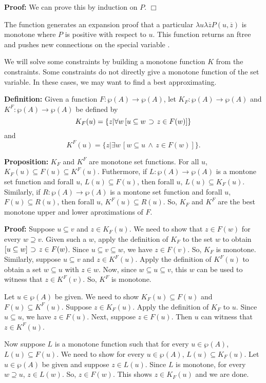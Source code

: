 {\bf Proof:}  We can prove this by induction on $P$.
$\Box$

The function  generates an expansion
proof that a particular $\lambda u\lambda \overline{z} P(u,\overline{z})$
is monotone where $P$ is positive with respect to $u$.
This function returns an ftree and pushes new connections
on the special variable .

We will solve some constraints by building a monotone function $K$
from the constraints.  Some constraints do not directly give a monotone
function of the set variable.  In these cases, we may want to find
a best approximating.

{\bf Definition:}  Given a function $F:\wp(A)\rightarrow\wp(A)$, let
$K_F:\wp(A)\rightarrow\wp(A)$ and $K^F:\wp(A)\rightarrow\wp(A)$ be
defined by 
$$K_F(u) = \{z | \forall w\, [u\subseteq w\, \mathbin{\supset} \,z\in F(w)]\}$$
and
$$K^F(u) = \{z | \exists w\, [w\subseteq u \,\land \,z\in F(w)]\}.$$

{\bf Proposition:}  $K_F$ and $K^F$ are monotone set functions.
For all $u$, $K_F(u)\subseteq F(u)\subseteq K^F(u)$.  Futhermore,
if $L:\wp(A)\rightarrow\wp(A)$ is a montone set function and
forall $u$, $L(u)\subseteq F(u)$, then forall $u$, $L(u)\subseteq K_F(u)$.
Similarly, if $R:\wp(A)\rightarrow\wp(A)$ is a montone set function and
forall $u$, $F(u)\subseteq R(u)$, then forall $u$, $K^F(u)\subseteq R(u)$.
So, $K_F$ and $K^F$ are the best monotone upper and lower aproximations of $F$.

{\bf Proof:}  Suppose $u\subseteq v$ and $z\in K_F(u)$.  We need to show
that $z\in F(w)$ for every $w\supseteq v$.  Given such a $w$,
apply the definition
of $K_F$ to the set $w$ to obtain $[u\subseteq w]\,\mathbin{\supset}\, z\in F(w)$.
Since $u\subseteq v\subseteq w$, we have $z\in F(v)$.  So, $K_F$ is monotone.  Similarly,
suppose $u\subseteq v$ and $z\in K^F(u)$.  Apply the definition of $K^F(u)$
to obtain a set $w\subseteq u$ with $z\in w$.  Now, since
$w\subseteq u\subseteq v$, this $w$ can be used
to witness that $z\in K^F(v)$.  So, $K^F$ is monotone.

Let $u\in\wp(A)$ be given.  We need to show $K_F(u)\subseteq F(u)$
and $F(u)\subseteq K^F(u)$.  Suppose $z\in K_F(u)$.  Apply the definition
of $K_F$ to $u$.  Since $u\subseteq u$, we have $z\in F(u)$.
Next, suppose $z\in F(u)$.  Then $u$ can witness that $z\in K^F(u)$.

Now suppose $L$ is a monotone function such that for every $u\in\wp(A)$,
$L(u)\subseteq F(u)$.  We need to show for every $u\in\wp(A)$, $L(u)\subseteq K_F(u)$.
Let $u\in\wp(A)$ be given and suppose $z\in L(u)$.  Since $L$ is monotone,
for every $w\supseteq u$, $z\in L(w)$.  So, $z\in F(w)$.  This shows $z\in K_F(u)$
and we are done.

